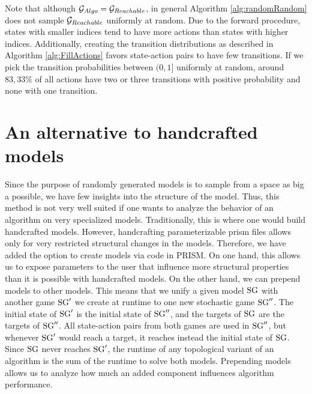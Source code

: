 Note that although $\mathcal{G}_{Algo} = \mathcal{G}_{Reachable}$, in general Algorithm \ref{alg:randomRandom} does not sample $\mathcal{G}_{Reachable}$ uniformly at random.
Due to the forward procedure, states with smaller indices tend to have more actions than states with higher indices.
Additionally, creating the transition distributions as described in Algorithm \ref{alg:FillActions} favors state-action pairs to have few transitions.
If we pick the transition probabilities between $(0, 1]$ uniformly at random, around $83,33\%$ of all actions have two or three transitions with positive probability and 
none with one transition.

\section{An alternative to handcrafted models} \label{sec:configs}
Since the purpose of randomly generated models is to sample from a space as big a possible, we have few insights into the structure of the model.
Thus, this method is not very well suited if one wants to analyze the behavior of an algorithm on very specialized models. 
Traditionally, this is where one would build handcrafted models. 
However, handcrafting parameterizable prism files allows only for very restricted structural changes in the models. 
Therefore, we have added the option to create models via code in PRISM. 
On one hand, this allows us to expose parameters to the user that influence more structural properties than it is possible with handcrafted models.
On the other hand, we can prepend models to other models.
This means that we unify a given model $\textrm{SG}$ with another game $\textrm{SG}'$ we create at runtime to one new stochastic game $\textrm{SG}''$.
The initial state of $\textrm{SG}'$ is the initial state of $\textrm{SG}''$, and the targets of $\textrm{SG}$ are the targets of $\textrm{SG}''$.
All state-action pairs from both games are used in $\textrm{SG}''$, but whenever $\textrm{SG}'$ would reach a target, it reaches instead the initial state of $\textrm{SG}$.
Since $\textrm{SG}$ never reaches $\textrm{SG}'$, the runtime of any topological variant of an algorithm is the sum of the runtime to solve both models.
Prepending models allows us to analyze how much an added component influences algorithm performance.


